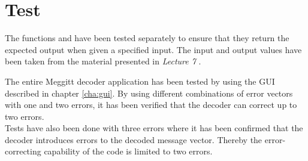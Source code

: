 \documentclass[Main]{subfiles}
\begin{document}
\chapter{Test}
The functions  and  have been tested separately to ensure that they return the expected output when given a specified input. The input and output values have been taken from the material presented in \emph{Lecture 7} \cite{lec7}.

The entire Meggitt decoder application has been tested by using the GUI described in chapter \ref{cha:gui}. By using different combinations of error vectors with one and two errors, it has been verified that the decoder can correct up to two errors.
\\Tests have also been done with three errors where it has been confirmed that the decoder introduces errors to the decoded message vector. Thereby the error-correcting capability of the code is limited to two errors.  
\end{document}
